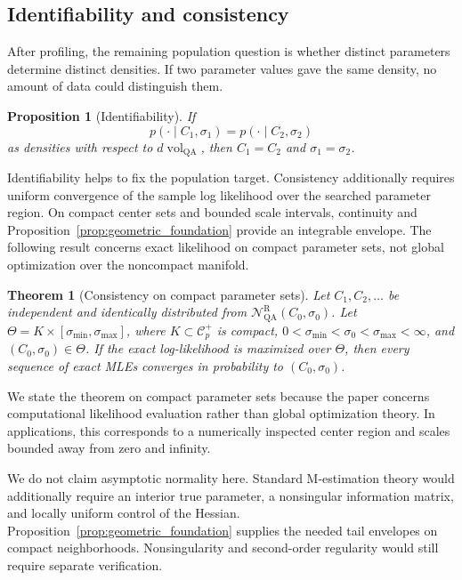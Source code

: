 \documentclass[
  12pt]{article}
\newcommand{\Corr}{\mathcal C^+}
\newcommand{\vol}{\operatorname{vol}}
\newcommand{\QA}{\mathrm{QA}}
\newcommand{\NR}{\mathcal N^{\mathrm R}_{\mathrm{QA}}}
\newtheorem{theorem}{Theorem}
\newtheorem{proposition}{Proposition}
\begin{document}
\subsection{Identifiability and consistency}

After profiling, the remaining population question is whether distinct parameters determine distinct densities. If two parameter values gave the same density, no amount of data could distinguish them.

\begin{proposition}[Identifiability]\label{prop:identifiability}
If
\[
p(\cdot\mid C_1,\sigma_1)=p(\cdot\mid C_2,
\sigma_2)
\]
as densities with respect to $d\vol_{\QA}$, then $C_1=C_2$ and $\sigma_1=\sigma_2$.
\end{proposition}

Identifiability helps to fix the population target. Consistency additionally requires uniform convergence of the sample log likelihood over the searched parameter region. On compact center sets and bounded scale intervals, continuity and Proposition~\ref{prop:geometric_foundation} provide an integrable envelope. The following result concerns exact likelihood on compact parameter sets, not global optimization over the noncompact manifold.

\begin{theorem}[Consistency on compact parameter sets]\label{thm:mle_consistency}
Let $C_1,C_2,\ldots$ be independent and identically distributed from $\NR(C_0,\sigma_0)$. Let $\Theta=K\times[\sigma_{\min},\sigma_{\max}]$, where $K\subset\Corr_p$ is compact, $0<\sigma_{\min}<\sigma_0<\sigma_{\max}<\infty$, and $(C_0,\sigma_0)\in\Theta$. If the exact log-likelihood is maximized over $\Theta$, then every sequence of exact MLEs converges in probability to $(C_0,\sigma_0)$.
\end{theorem}

We state the theorem on compact parameter sets because the paper concerns computational likelihood evaluation rather than global optimization theory. In applications, this corresponds to a numerically inspected center region and scales bounded away from zero and infinity.

We do not claim asymptotic normality here. Standard M-estimation theory would additionally require an interior true parameter, a nonsingular information matrix, and locally uniform control of the Hessian. Proposition~\ref{prop:geometric_foundation} supplies the needed tail envelopes on compact neighborhoods. Nonsingularity and second-order regularity would still require separate verification.
\end{document}
